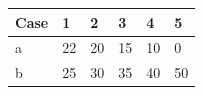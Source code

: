 \documentclass[12pt,letterpaper]{article}
\begin{document}
\begin{enumerate}[label=\Alph*]
\begin{table}[H]

       \vspace*{0.3cm}
          \begin{tabular}{l|lllll} \toprule
            Case  & 1   &  2  &  3  &  4   &  5\\ \midrule
            a     & 22  &  20 &  15 &  10  &  0\\
            b     & 25  &  30 &  35 &  40  &  50\\ \bottomrule
          \end{tabular}
       \end{table}


\end{enumerate}
\end{document}
